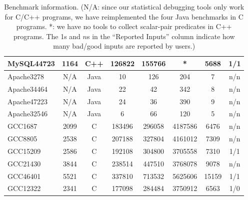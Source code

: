 \begin{table}
\begin{tabular}{lccccccc}
    MySQL44723       & 1164        & C++              & 126822         & 155766        & *                & 5688          & 1/1            \\
    \midrule
    Apache3278       & N/A         & Java             & 10             & 126           & 204                & 7             & n/n           \\
    Apache34464      & N/A         & Java             & 22             & 42            & 342                & 8             & n/n           \\
    Apache47223      & N/A         & Java             & 24             & 36            & 390                & 9             & n/n           \\
    Apache32546      & N/A         & Java             & 6              & 66            & 120                & 5             & n/n           \\
    \midrule
    GCC1687          & 2099        & C                &  183496 & 296058 & 4187586 & 6476     & n/n            \\
    GCC8805          & 2538        & C                &  207188 & 327804 & 4161012 & 7309     & n/n            \\
    GCC15209         & 2586        & C                &  192108 & 304800 & 3705558 & 7310     & 1/1            \\
    GCC21430         & 3844        & C                &  238514 & 447510 & 3768078 & 9078     & n/n            \\
    GCC46401         & 5521        & C                &  337810 & 713532 & 5625606 & 15159    & 1/1            \\
    GCC12322         & 2341        & C                &  177098 & 284484 & 3750912 & 6563     & 1/0            \\
    \bottomrule
   \end{tabular}
  \nocaptionrule
  \caption{Benchmark information. (N/A: since our statistical debugging tools 
      only work for C/C++ programs, we have 
	reimplemented the four Java benchmarks in C programs. *: we have no
	tools to collect scalar-pair predicates in C++ programs. 
	The 1s and $n$s in the
	``Reported Inputs'' column indicate how many bad/good inputs are reported
	by users.)}
  \label{tab:benchmarks}
\end{table}

